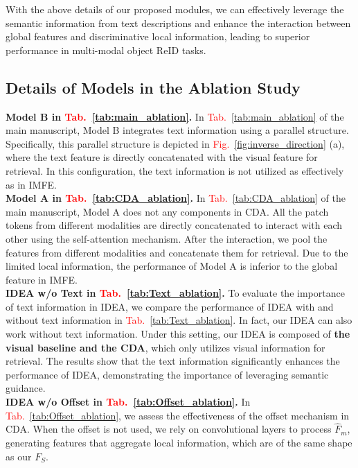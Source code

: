 With the above details of our proposed modules, we can effectively leverage the semantic information from text descriptions and enhance the interaction between global features and discriminative local information, leading to superior performance in multi-modal object ReID tasks.
\subsection{Details of Models in the Ablation Study}
\textbf{Model B in \textcolor{red}{Tab.}~\ref{tab:main_ablation}.}
%
In \textcolor{red}{Tab.}~\ref{tab:main_ablation} of the main manuscript, Model B integrates text information using a parallel structure.
%
Specifically, this parallel structure is depicted in \textcolor{red}{Fig.}~\ref{fig:inverse_direction} (a), where the text feature is directly concatenated with the visual feature for retrieval.
%
In this configuration, the text information is not utilized as effectively as in IMFE.
\\
\textbf{Model A in \textcolor{red}{Tab.}~\ref{tab:CDA_ablation}.}
%
In \textcolor{red}{Tab.}~\ref{tab:CDA_ablation} of the main manuscript, Model A does not any components in CDA.
%
All the patch tokens from different modalities are directly concatenated to interact with each other using the self-attention mechanism.
%
After the interaction, we pool the features from different modalities and concatenate them for retrieval.
%
Due to the limited local information, the performance of Model A is inferior to the global feature in IMFE.
\\
\textbf{IDEA w/o Text in \textcolor{red}{Tab.}~\ref{tab:Text_ablation}.}
%
To evaluate the importance of text information in IDEA, we compare the performance of IDEA with and without text information in \textcolor{red}{Tab.}~\ref{tab:Text_ablation}.
%
In fact, our IDEA can also work without text information.
%
Under this setting, our IDEA is composed of \textbf{the visual baseline and the CDA}, which only utilizes visual information for retrieval.
%
The results show that the text information significantly enhances the performance of IDEA, demonstrating the importance of leveraging semantic guidance.
\\
\textbf{IDEA w/o Offset in \textcolor{red}{Tab.}~\ref{tab:Offset_ablation}.}
%
In \textcolor{red}{Tab.}~\ref{tab:Offset_ablation}, we assess the effectiveness of the offset mechanism in CDA.
%
When the offset is not used, we rely on convolutional layers to process \( \hat{F}_{m} \), generating features that aggregate local information, which are of the same shape as our \( F_{S} \).
